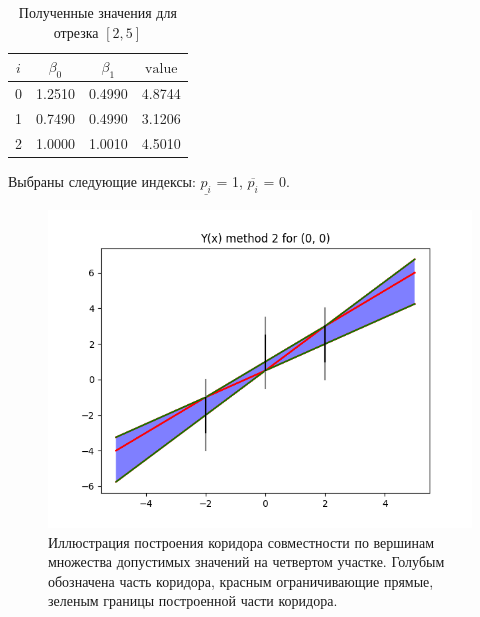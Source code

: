 \begin{table}[H]
    \centering
    \begin{tabular}{|c|c|c|c|}
        \hline
        $i$ & $\beta_0$ & $\beta_1$ & $\text{value}$ \\ \hline
        0 & 1.2510 & 0.4990 & 4.8744 \\ \hline
        1 & 0.7490 & 0.4990 & 3.1206 \\ \hline
        2 & 1.0000 & 1.0010 & 4.5010 \\ \hline
    \end{tabular}
    \caption{Полученные значения для отрезка $[2, 5]$}
    \label{tab:my_label}
\end{table}

Выбраны следующие индексы: $\underline{p_i}$ = 1, $\overline{p_i}$ = 0.

\begin{figure}[H]
    \centering
    \includegraphics[width=0.8\linewidth]{image/3_example.png}
    \caption{Иллюстрация построения коридора совместности по вершинам множества допустимых значений на четвертом участке. Голубым обозначена часть коридора, красным ограничивающие прямые, зеленым границы построенной части коридора.}
    \label{fig:my_label}
\end{figure}